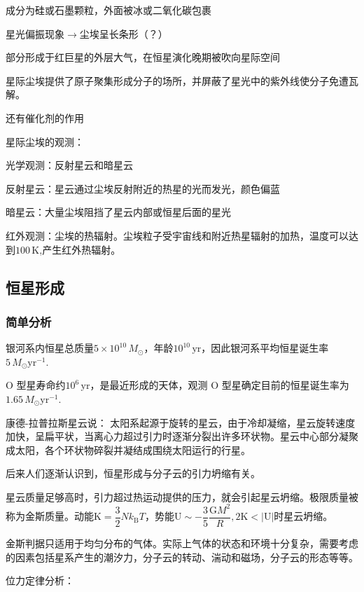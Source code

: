 \documentclass[../天体物理基础.tex]{subfiles}
\begin{document}
成分为硅或石墨颗粒，外面被冰或二氧化碳包裹

星光偏振现象$\to$尘埃呈长条形（？）

部分形成于红巨星的外层大气，在恒星演化晚期被吹向星际空间

星际尘埃提供了原子聚集形成分子的场所，并屏蔽了星光中的紫外线使分子免遭瓦解。

还有催化剂的作用

星际尘埃的观测：

光学观测：反射星云和暗星云

反射星云：星云通过尘埃反射附近的热星的光而发光，颜色偏蓝

暗星云：大量尘埃阻挡了星云内部或恒星后面的星光

红外观测：尘埃的热辐射。尘埃粒子受宇宙线和附近热星辐射的加热，温度可以达到$100\,\mathrm{K}$,产生红外热辐射。

\subsection{恒星形成}

\subsubsection{简单分析}

银河系内恒星总质量$5\times10^{10}\,M_{\odot}$，年龄$10^{10}\,\mathrm{yr}$，因此银河系平均恒星诞生率$5\,M_{\odot}\mathrm{yr^{-1}}$.

O 型星寿命约$10^{6}\,\mathrm{yr}$，是最近形成的天体，观测 O 型星确定目前的恒星诞生率为$1.65\,M_{\odot}\mathrm{yr^{-1}}$.

康德{}-{}拉普拉斯星云说：
太阳系起源于旋转的星云，由于冷却凝缩，星云旋转速度加快，呈扁平状，当离心力超过引力时逐渐分裂出许多环状物。星云中心部分凝聚成太阳，各个环状物碎裂并凝结成围绕太阳运行的行星。

后来人们逐渐认识到，恒星形成与分子云的引力坍缩有关。

星云质量足够高时，引力超过热运动提供的压力，就会引起星云坍缩。极限质量被称为金斯质量。动能$\text{K}=\dfrac{3}{2}Nk_{\text{B}}T$，势能$\text{U}\sim-\dfrac{3}{5}\dfrac{\text{G}M^{2}}{R},2\text{K}<\left\vert{}\text{U}\right\vert{}$时星云坍缩。

金斯判据只适用于均匀分布的气体。实际上气体的状态和环境十分复杂，需要考虑的因素包括星系产生的潮汐力，分子云的转动、湍动和磁场，分子云的形态等等。

位力定律分析：
\end{document}
